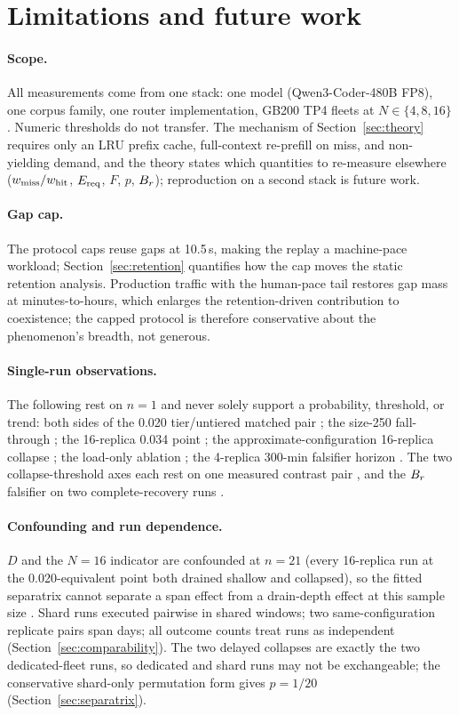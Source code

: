 \section{Limitations and future work}
\label{sec:limitations}

\paragraph{Scope.} All measurements come from one stack: one model
(Qwen3-Coder-480B FP8), one corpus family, one router
implementation, GB200 TP4 fleets at $N \in \{4, 8, 16\}$. Numeric
thresholds do not transfer. The mechanism of Section~\ref{sec:theory} requires only
an LRU prefix cache, full-context re-prefill on miss, and
non-yielding demand, and the theory states which quantities to
re-measure elsewhere ($w_{\mathrm{miss}}/w_{\mathrm{hit}}$, $E_{\mathrm{req}}$, $F$, $p$, $B_r$); reproduction
on a second stack is future work.

\paragraph{Gap cap.} The protocol caps reuse gaps at 10.5\,s, making the replay a
machine-pace workload; Section~\ref{sec:retention} quantifies how the cap moves the
static retention analysis. Production traffic with the human-pace
tail restores gap mass at minutes-to-hours, which enlarges the
retention-driven contribution to coexistence; the capped protocol is
therefore conservative about the phenomenon's breadth, not
generous.

\paragraph{Single-run observations.} The following rest on $n=1$ and never solely
support a probability, threshold, or trend: both sides of the 0.020
tier/untiered matched pair ; the size-250 fall-through ;
the 16-replica 0.034 point ; the approximate-configuration
16-replica collapse ; the load-only ablation ; the
4-replica 300-min falsifier horizon . The two collapse-threshold
axes each rest on one measured contrast pair , and the $B_r$
falsifier on two complete-recovery runs .

\paragraph{Confounding and run dependence.} $D$ and the $N{=}16$ indicator are
confounded at $n=21$ (every 16-replica run at the 0.020-equivalent
point both drained shallow and collapsed), so the fitted separatrix
cannot separate a span effect from a drain-depth effect at this
sample size . Shard runs executed pairwise in shared windows;
two same-configuration replicate pairs span days; all outcome counts
treat runs as independent (Section~\ref{sec:comparability}). The two delayed collapses
are exactly the two dedicated-fleet runs, so dedicated and shard
runs may not be exchangeable; the conservative shard-only
permutation form gives $p = 1/20$ (Section~\ref{sec:separatrix}).

